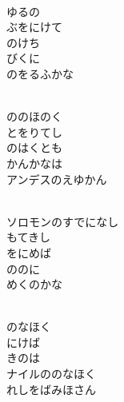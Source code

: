 \documentclass[10pt,b5j]{tarticle} %
\begin{document}
\vspace{1.5em} %
\newcommand{\linespace}{0.5em} %
\newcommand{\blocksize}{0.5\hsize} %
\newcommand{\itemmargin}{6em} %
\begin{enumerate} %
    \setlength{\itemindent}{\itemmargin} %
    \begin{minipage}[c]{\blocksize}
    
        \vspace{\linespace}
        \item~\\
        ゆるの\\
        ぶをにけて\\
        のけち\\
        びくに\\
        のをるふかな
        
        \vspace{\linespace}
        \item~\\
        ののほのく\\
        とをりてし\\
        のはくとも\\
        かんかなは\\
        アンデスのえゆかん
        
        \vspace{\linespace}
        \item~\\
        ソロモンのすでになし\\
        もてきし\\
        をにめば\\
        ののに\\
        めくのかな
        
        \vspace{\linespace}
        \item~\\
        のなほく\\
        にけば\\
        きのは\\
        ナイルののなほく\\
        れしをばみほさん
        

\end{minipage}
\end{enumerate}
\end{document}
